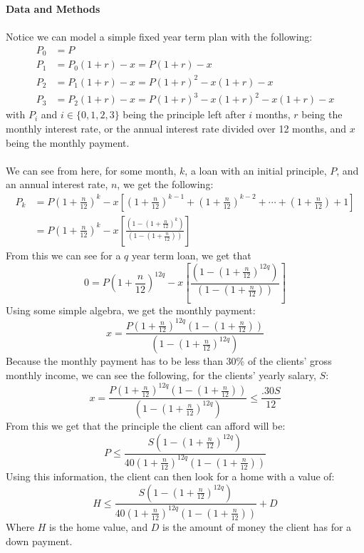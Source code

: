 \documentclass[12pt]{article}
\newenvironment{Section}[1]{}{\newpage}
\begin{document}
	\begin{Section}{Data}
		\textbf{\Huge Data and Methods}
		\\ \\
		Notice we can model a simple fixed year term plan with the following: 
		\begin{align*}
			P_0 &= P \\
			P_1 &= P_0(1 + r) - x = P(1 + r) - x \\
			P_2 &= P_1(1 + r) - x = P(1 + r)^2 - x(1 + r) - x \\
			P_3 &= P_2(1 + r) - x = P(1 + r)^3 - x(1 + r)^2 - x(1 + r) - x
		\end{align*}
		with $P_i$ and $i \in \{0,1,2,3\}$ being the principle left after $i$ months, $r$ being the monthly interest rate, or the annual interest rate divided over 12 months, and $x$ being the monthly payment.
		\\ \\
		We can see from here, for some month, $k$, a loan with an initial principle, $P$, and an annual interest rate, $n$, we get the following:
		\begin{align*}
			P_{k} &= P\left(1 + \frac{n}{12}\right)^{k} - x\left[\left(1 + \frac{n}{12}\right)^{k - 1} + \left(1 + \frac{n}{12}\right)^{k - 2} + \cdots + \left(1 + \frac{n}{12}\right) + 1\right] \\
			&= P\left(1 + \frac{n}{12}\right)^{k} - x\left[\frac{\left(1 - \left(1 + \frac{n}{12}\right)^{k}\right)}{\left(1 - \left(1 + \frac{n}{12}\right) \right)}\right]
		\end{align*}
		From this we can see for a $q$ year term loan, we get that 
		\[0 = P\left(1 + \frac{n}{12}\right)^{12q} - x\left[\frac{\left(1 - \left(1 + \frac{n}{12}\right)^{12q}\right)}{\left(1 - \left(1 + \frac{n}{12}\right) \right)}\right]\]
		Using some simple algebra, we get the monthly payment:
		\[x = \frac{P\left(1 + \frac{n}{12}\right)^{12q}\left(1 - \left(1 + \frac{n}{12}\right) \right)}{\left(1 - \left(1 + \frac{n}{12}\right)^{12q}\right)}\]
		\newpage
		Because the monthly payment has to be less than 30\% of the clients' gross monthly income, we can see the following, for the clients' yearly salary, $S$:
		\[x = \frac{P\left(1 + \frac{n}{12}\right)^{12q}\left(1 - \left(1 + \frac{n}{12}\right) \right)}{\left(1 - \left(1 + \frac{n}{12}\right)^{12q}\right)} \leq \frac{.30S}{12}\]
		From this we get that the principle the client can afford will be:
		\[P \leq \frac{S\left(1 - \left(1 + \frac{n}{12}\right)^{12q}\right)}{40\left(1 + \frac{n}{12}\right)^{12q}\left(1 - \left(1 + \frac{n}{12}\right) \right)}\]
		Using this information, the client can then look for a home with a value of:
		\[H \leq \frac{S\left(1 - \left(1 + \frac{n}{12}\right)^{12q}\right)}{40\left(1 + \frac{n}{12}\right)^{12q}\left(1 - \left(1 + \frac{n}{12}\right) \right)} + D\]
		Where $H$ is the home value, and $D$ is the amount of money the client has for a down payment.
	\end{Section}
\end{document}
